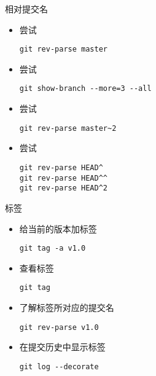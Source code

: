 \begin{frame}[<+->][fragile]{相对提交名}
    \begin{itemize}
        \item 尝试
\begin{Verbatim}[frame=single,commandchars=\\\{\}]
git rev-parse master
\end{Verbatim}
        \item 尝试
\begin{Verbatim}[frame=single,commandchars=\\\{\}]
git show-branch --more=3 --all
\end{Verbatim}
        \item 尝试
\begin{Verbatim}[frame=single,commandchars=\\\{\}]
git rev-parse master~2
\end{Verbatim}
        \item 尝试
\begin{Verbatim}[frame=single,commandchars=\\\{\}]
git rev-parse HEAD^
git rev-parse HEAD^^
git rev-parse HEAD^2
\end{Verbatim}
    \end{itemize}
\end{frame}

\begin{frame}[<+->][fragile]{标签}
    \begin{itemize}
        \item 给当前的版本加标签
        \begin{Verbatim}[frame=single,commandchars=\\\{\}]
git tag -a v1.0
        \end{Verbatim}
        \item 查看标签
        \begin{Verbatim}[frame=single,commandchars=\\\{\}]
git tag
        \end{Verbatim}
        \item 了解标签所对应的提交名
        \begin{Verbatim}[frame=single,commandchars=\\\{\}]
git rev-parse v1.0
        \end{Verbatim}
        \item 在提交历史中显示标签
        \begin{Verbatim}[frame=single,commandchars=\\\{\}]
git log --decorate
        \end{Verbatim}
    \end{itemize}
\end{frame}

